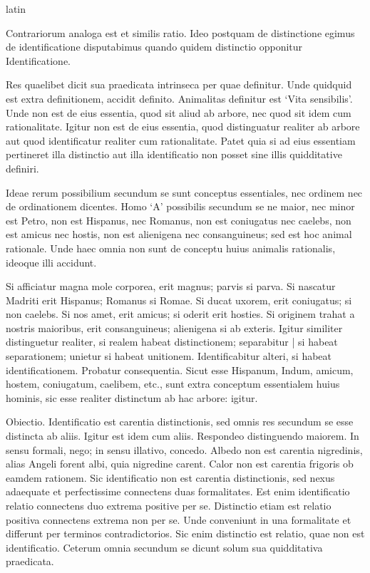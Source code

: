 \begin{otherlanguage*}{latin}
        \pstart
        \pend
      
\pstart
 Contrariorum analoga est et similis ratio. Ideo postquam de distinctione egimus de identificatione disputabimus quando quidem distinctio opponitur Identificatione. 
\pend

\pstart
 Res quaelibet dicit sua praedicata intrinseca per quae definitur. Unde quidquid est extra definitionem, accidit definito. Animalitas definitur est `Vita sensibilis'. Unde non est de eius essentia, quod sit aliud ab arbore, nec quod sit idem cum rationalitate. Igitur non est de eius essentia, quod distinguatur realiter ab arbore aut quod identificatur realiter cum rationalitate. Patet quia si ad eius essentiam pertineret illa distinctio aut illa identificatio non posset sine illis quidditative definiri. 
\pend

\pstart
 Ideae rerum possibilium secundum se sunt conceptus essentiales, nec ordinem nec de ordinationem dicentes. Homo `A' possibilis secundum se ne maior, nec minor est Petro, non est Hispanus, nec Romanus, non est coniugatus nec caelebs, non est amicus nec hostis, non est alienigena nec consanguineus; sed est hoc animal rationale. Unde haec omnia non sunt de conceptu huius animalis rationalis, ideoque illi accidunt. 
\pend

\pstart
 Si afficiatur magna mole corporea, erit magnus; parvis si parva. Si nascatur Madriti erit Hispanus; Romanus si Romae. Si ducat uxorem, erit coniugatus; si non caelebs. Si nos amet, erit amicus; si oderit erit hosties. Si originem trahat a nostris maioribus, erit consanguineus; alienigena si ab exteris. Igitur similiter distinguetur realiter, si realem habeat distinctionem; separabitur \textnormal{|} si habeat separationem; unietur si habeat unitionem. Identificabitur alteri, si habeat identificationem. Probatur consequentia. Sicut esse Hispanum, Indum, amicum, hostem, coniugatum, caelibem, etc., sunt extra conceptum essentialem huius hominis, sic esse realiter distinctum ab hac arbore: igitur. 
\pend

\pstart
 Obiectio. Identificatio est carentia distinctionis, sed omnis res secundum se esse distincta ab  aliis. Igitur est idem cum aliis. Respondeo distinguendo maiorem. In sensu formali, nego; in sensu illativo, concedo. Albedo non est carentia nigredinis, alias Angeli forent albi, quia nigredine carent. Calor non est carentia frigoris ob eamdem rationem. Sic identificatio non est carentia distinctionis, sed nexus adaequate et perfectissime connectens duas formalitates. Est enim identificatio relatio connectens duo extrema positive per se. Distinctio etiam est relatio positiva connectens extrema non per se. Unde conveniunt in una formalitate et differunt per terminos contradictorios. Sic enim distinctio est relatio, quae non est identificatio. Ceterum omnia secundum se dicunt solum sua quidditativa praedicata. 
\pend


\end{otherlanguage*}

